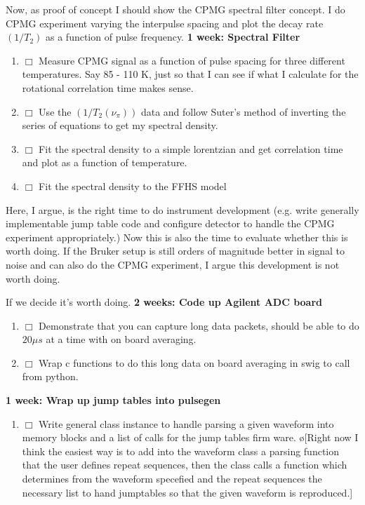 \documentclass[10pt]{book}
\begin{document}
{Now, as proof of concept I should show the CPMG spectral filter concept. I do CPMG experiment varying the interpulse spacing and plot the decay rate $(1/T_2)$ as a function of pulse frequency.
{\bf 1 week: Spectral Filter}
\begin{enumerate}
    \item $\Box$ Measure CPMG signal as a function of pulse spacing for three different temperatures. Say 85 - 110 K, just so that I can see if what I calculate for the rotational correlation time makes sense.
    \item $\Box$ Use the $(1/T_2(\nu_{\pi}))$ data and follow Suter's method of inverting the series of equations to get my spectral density.
    \item $\Box$ Fit the spectral density to a simple lorentzian and get correlation time and plot as a function of temperature.
    \item $\Box$ Fit the spectral density to the FFHS model\\
\end{enumerate}

Here, I argue, is the right time to do instrument development (e.g. write generally implementable jump table code and configure detector to handle the CPMG experiment appropriately.) Now this is also the time to evaluate whether this is worth doing. If the Bruker setup is still orders of magnitude better in signal to noise and can also do the CPMG experiment, I argue this development is not worth doing.

If we decide it's worth doing.
{\bf 2 weeks: Code up Agilent ADC board}
\begin{enumerate}
    \item $\Box$ Demonstrate that you can capture long data packets, should be able to do $20 \mu s$ at a time with on board averaging.
    \item $\Box$ Wrap c functions to do this long data on board averaging in swig to call from python.\\
\end{enumerate}

{\bf 1 week: Wrap up jump tables into pulsegen}
\begin{enumerate}
    \item $\Box$ Write general class instance to handle parsing a given waveform into memory blocks and a list of calls for the jump tables firm ware. \o[Right now I think the easiest way is to add into the waveform class a parsing function that the user defines repeat sequences, then the class calls a function which determines from the waveform specefied and the repeat sequences the necessary list to hand jumptables so that the given waveform is reproduced.]{}\\
\end{enumerate}

}
\end{document}
